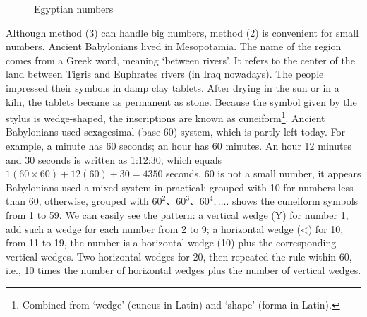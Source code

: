 \documentclass[b5paper]{article}
\begin{document}
\begin{figure}[htbp]
 \centering
 \caption{Egyptian numbers}
 \label{fig:egypt-number-examples}
\end{figure}

  
Although method (3) can handle big numbers, method (2) is convenient for small numbers. Ancient Babylonians lived in Mesopotamia. The name of the region comes from a Greek word, meaning `between rivers'. It refers to the center of the land between Tigris and Euphrates rivers (in Iraq nowadays). The people impressed their symbols in damp clay tablets. After drying in the sun or in a kiln, the tablets became as permanent as stone. Because the symbol given by the stylus is wedge-shaped, the inscriptions are known as cuneiform\footnote{Combined from `wedge' (cuneus in Latin) and `shape' (forma in Latin).}. Ancient Babylonians used sexagesimal (base 60) system, which is partly left today. For example, a minute has 60 seconds; an hour has 60 minutes. An hour 12 minutes and 30 seconds is written as 1:12:30, which equals $1(60\times 60) + 12(60) + 30 = 4350$ seconds. 60 is not a small number, it appears Babylonians used a mixed system in practical: grouped with 10 for numbers less than 60, otherwise, grouped with $60^2$、$60^3$、$60^4, \dotsc$.  shows the cuneiform symbols from 1 to 59. We can easily see the pattern: a vertical wedge (Y) for number 1, add such a wedge for each number from 2 to 9; a horizontal wedge (<) for 10, from 11 to 19, the number is a horizontal wedge (10) plus the corresponding vertical wedges. Two horizontal wedges for 20, then repeated the rule within 60, i.e., 10 times the number of horizontal wedges plus the number of vertical wedges.
\end{document}
